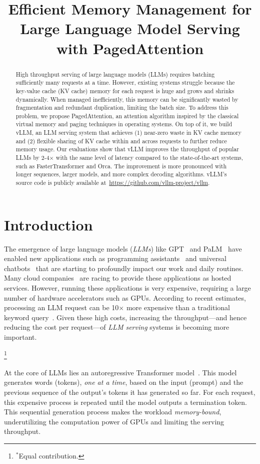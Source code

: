 \title{Efficient Memory Management for Large Language Model Serving with PagedAttention}

\begin{abstract}
High throughput serving of large language models (LLMs) requires batching sufficiently many requests at a time. However, existing systems struggle because the key-value cache (KV cache) memory for each request is huge and grows and shrinks dynamically. When managed inefficiently, this memory can be significantly wasted by fragmentation and redundant duplication, limiting the batch size. To address this problem, we propose PagedAttention, an attention algorithm inspired by the classical virtual memory and paging techniques in operating systems. On top of it, we build vLLM, an LLM serving system that achieves (1) near-zero waste in KV cache memory and (2) flexible sharing of KV cache within and across requests to further reduce memory usage. Our evaluations show that vLLM improves the throughput of popular LLMs by 2-4$\times$ with the same level of latency compared to the state-of-the-art systems, such as FasterTransformer and Orca. The improvement is more pronounced with longer sequences, larger models, and more complex decoding algorithms. vLLM's source code is publicly available at~\url{https://github.com/vllm-project/vllm}.
\end{abstract}

\section{Introduction}
\label{sec:intro}

The emergence of large language models (\emph{LLMs}) like GPT~\cite{openai2023gpt4,brown2020language} and PaLM~\cite{chowdhery2022palm} have enabled new applications such as programming assistants~\cite{copilot, chen2021evaluating} and universal chatbots~\cite{chatgpt, bard} that are starting to profoundly impact our work and daily routines. Many cloud companies~\cite{openaiapi, amazonbedrock} are racing to provide these applications as hosted services. However, running these applications is very expensive, requiring a large number of hardware accelerators such as GPUs. According to recent estimates, processing an LLM request can be 10$\times$ more expensive than a traditional keyword query~\cite{chat-cost}. Given these high costs, increasing the throughput---and hence reducing the cost per request---of \emph{LLM serving} systems is becoming more important.

{\let\thefootnote\relax\footnote{{$^*$Equal contribution.}}\addtocounter{footnote}{-1}} At the core of LLMs lies an autoregressive Transformer model~\cite{vaswani2017attention}. This model generates words (tokens), \emph{one at a time}, based on the input (prompt) and the previous sequence of the output's tokens it has generated so far. For each request, this expensive process is repeated until the model outputs a termination token. This sequential generation process makes the workload \emph{memory-bound}, underutilizing the computation power of GPUs and limiting the serving throughput.

